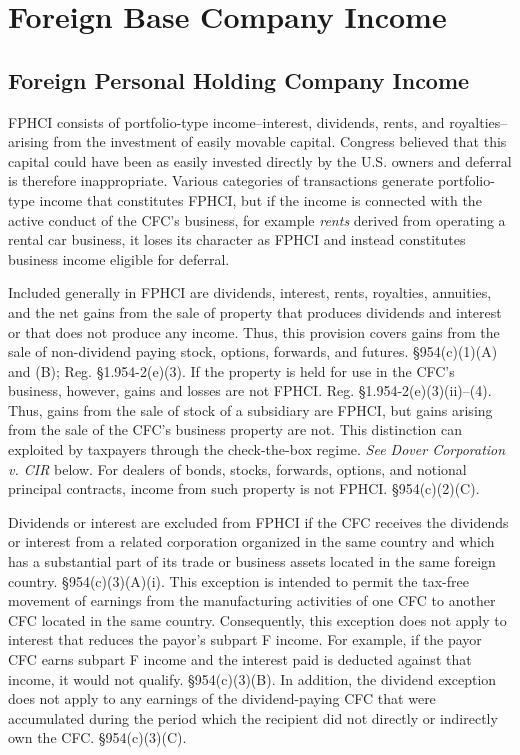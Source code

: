 			\section{Foreign Base Company Income}
		
			
		\subsection{Foreign Personal Holding Company Income}
		
		
FPHCI consists of portfolio-type income--interest, dividends, rents, and royalties--arising from the investment of easily movable capital.  Congress believed that this capital could have been as easily invested directly by the U.S. owners and deferral is therefore inappropriate.  Various categories of transactions generate portfolio-type income that constitutes FPHCI, but if the income is connected with the active conduct of the CFC's business, for example \emph{rents} derived from operating a rental car business, it loses its character as FPHCI and instead constitutes business income eligible for deferral.  

Included generally in FPHCI are dividends, interest, rents, royalties, annuities, and the net gains from the sale of property that produces dividends and interest or that does not produce any income. Thus, this provision covers gains from the sale of non-dividend paying stock, options, forwards, and futures.  \S 954(c)(1)(A) and (B); Reg. \S 1.954-2(e)(3).  If the property is held for use in the CFC's business, however, gains and losses are not FPHCI.  Reg. \S1.954-2(e)(3)(ii)--(4). Thus, gains from the sale of stock of a subsidiary are FPHCI, but gains arising from the sale of the CFC's business property are not.  This distinction can exploited by taxpayers through the check-the-box regime.  \emph{See Dover Corporation v. CIR} below.  For dealers of bonds, stocks, forwards, options, and notional principal contracts, income from such property is not FPHCI.  \S 954(c)(2)(C). 

Dividends or interest are excluded from FPHCI if the CFC receives the dividends or interest from a related corporation organized in the same country and which has a substantial part of its trade or business assets located  in the same foreign country.  \S 954(c)(3)(A)(i).  This  exception is intended to permit the tax-free movement of earnings from the manufacturing activities of one CFC to another CFC located in the same country.  Consequently, this exception does not apply to interest that reduces the payor's subpart F income.  For example, if the payor CFC earns subpart F income and the interest paid is deducted against that income, it would not qualify.  \S 954(c)(3)(B).  In addition, the dividend exception does not apply to any earnings of the dividend-paying CFC that were accumulated during the period which the recipient did not directly or indirectly own the CFC.  \S 954(c)(3)(C).  

